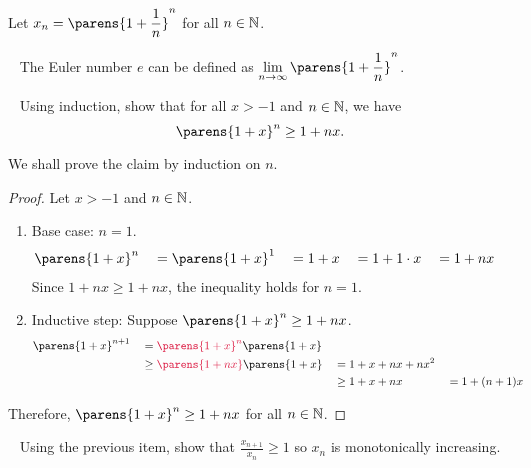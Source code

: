 \begin{problem}
  Let $\displaystyle x_n = \parens{1 + \frac{1}{n}}^n$
  for all $n \in \mathbb{N}$.

  \begin{remark}~\label{remark:euler}
    The Euler number $e$ can be defined as
    $\displaystyle \lim_{n \to \infty}{\parens{1 + \frac{1}{n}}^n}$.
  \end{remark}

  \begin{enumroman}
    \item~\label{step:2.1} Using induction, show that for all $x > -1$ and $n \in \mathbb{N}$, we have
      \[ \parens{1 + x}^n \geq 1 + nx. \]

      \begin{answer}
        We shall prove the claim by induction on $n$.

        \begin{proof}
          Let $x > -1$ and $n \in \mathbb{N}$.
          \begin{enumerate}
            \item Base case: $n = 1$.
              \begin{alignat*}{5}
                &\parens{1 + x}^n &&= \parens{1 + x}^1 &&= 1 + x &&= 1 + 1 \cdot x &&= 1 + nx
              \end{alignat*}
              Since $1 + nx \geq 1 + nx$, the inequality holds for $n = 1$.
            \item Inductive step: Suppose $\parens{1 + x}^n \geq 1 + nx$.
              \begin{alignat*}{5}
                &\parens{1 + x}^{n+1} &&= \crim{\parens{1 + x}^n} \parens{1 + x} \\
                & &&\geq \crim{\parens{1 + nx}} \parens{1 + x} &&= 1 + x + nx + nx^2 \\
                & && &&\geq 1 + x + nx &&= 1 + (n+1)x
              \end{alignat*}
          \end{enumerate}
          Therefore, $\parens{1 + x}^n \geq 1 + nx$ for all $n \in \mathbb{N}$.
        \end{proof}
      \end{answer}

    \newpage
    \item~\label{step:2.2} Using the previous item, show that
      $\displaystyle  \frac{x_{n+1}}{x_n} \geq 1$ so $x_n$
      is monotonically increasing.


\end{enumroman}
\end{problem}
